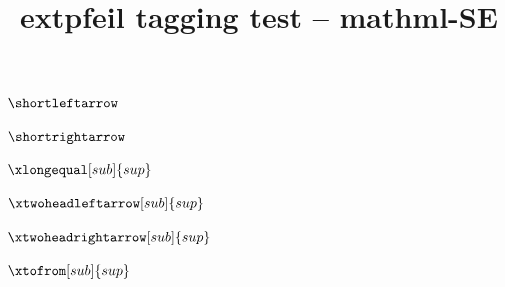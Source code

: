 \documentclass{article}
\title{extpfeil tagging test -- mathml-SE}
\begin{document}
$\shortleftarrow$

$\shortrightarrow$

$\xlongequal[sub]{sup}$

$\xtwoheadleftarrow[sub]{sup}$

$\xtwoheadrightarrow[sub]{sup}$

$\xtofrom[sub]{sup}$
\end{document}
